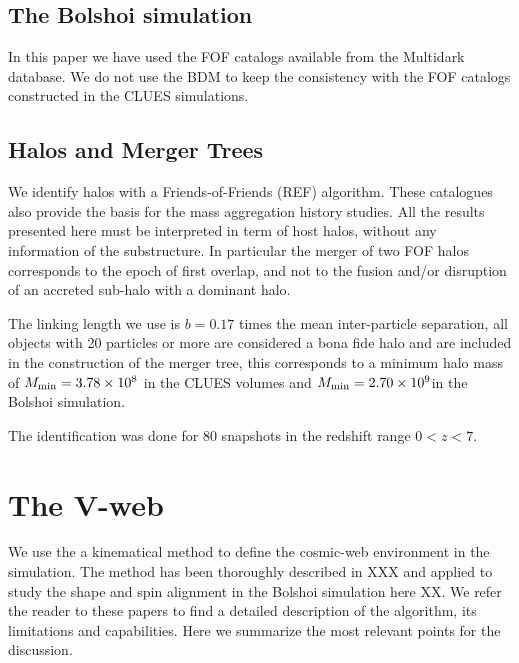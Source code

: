 \documentclass[usenatbib]{mn2e}
\begin{document}
\subsection{The Bolshoi simulation}
\label{subsec:Bolshoi_simulation}


In this paper we have used the FOF catalogs available from the Multidark 
database. We do not use the BDM to keep the consistency with the FOF 
catalogs constructed in the CLUES simulations. 


\subsection{Halos and Merger Trees}
\label{subsec:halos_merger_trees}


We identify halos with a Friends-of-Friends (REF) algorithm. These 
catalogues also provide the basis for the mass aggregation history studies. 
All the results presented here must be interpreted in term of host halos, 
without any information of the substructure. In particular the merger of 
two FOF halos corresponds to the epoch of first overlap, and not to the 
fusion and/or disruption of an accreted sub-halo with a dominant halo. 


The linking length we use is $b=0.17$ times the mean inter-particle 
separation, all objects with 20 particles or more are considered a bona 
fide halo and are included in the construction of the merger tree, this 
corresponds to a minimum halo mass of $M_{\rm min}=3.78\times 10^{8}$
\hMsun in the CLUES volumes and $M_{\rm min}=2.70\times 10^{9}$\hMsun in 
the Bolshoi simulation. 


The identification was done for 80 snapshots in the redshift range $0<z<7$.


\section{The V-web}
\label{sec:Vweb}


We use the a kinematical method to define the cosmic-web environment in 
the simulation. The method has been thoroughly described in XXX and 
applied to study the shape and spin alignment in the Bolshoi simulation 
here XX. We refer the reader to these papers to find a detailed description 
of the algorithm, its limitations and capabilities. Here we summarize the
most relevant points for the discussion. 
\end{document}

